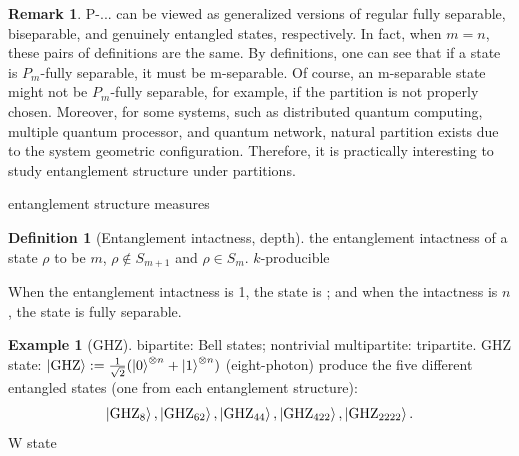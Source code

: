 \documentclass[
aps,
pra,
linenumbers,
floatfix,
]{revtex4-2}
\theoremstyle{plain}
\theoremstyle{definition}
\newtheorem{definition}{Definition}
\newtheorem{example}{Example}
\newtheorem{remark}{Remark}
\newcommand{\ghz}{\text{GHZ}}
\newcommand{\dm}{\rho}
\begin{document}
\begin{remark}
	P-... can be viewed as generalized versions of regular fully separable, biseparable, and genuinely entangled states, respectively.
	In fact, when $m=n$, these pairs of definitions are the same.
	By definitions, one can see that if a state is $P_m$-fully separable, it must be m-separable. Of course, an m-separable state might not be $P_m$-fully separable, for example, if the partition is not properly chosen.
	Moreover, for some systems, such as distributed quantum computing, multiple quantum processor, and quantum network, natural partition exists due to the system geometric conﬁguration. Therefore, it is practically interesting to study entanglement structure under partitions.
\end{remark}
entanglement structure measures
\begin{definition}[Entanglement intactness, depth]
	the entanglement intactness of a state $\dm$ to be $m$, \iff $\dm\notin S_{m+1}$ and $\dm\in S_m$.
	$k$-producible
\end{definition}
	When the entanglement intactness is 1, the state is ; and when the intactness is $n$, the state is fully separable.
\begin{example}[GHZ]\label{exm:ghz}
	bipartite: Bell states;
	nontrivial multipartite: tripartite.
	GHZ state: $\ket{\ghz}:=\frac{1}{\sqrt{2}}(\ket{0}^{\otimes n} + \ket{1}^{\otimes n} )$ (eight-photon) produce the five different entangled states (one from each entanglement structure): 
	\begin{equation*}
		\ket{\ghz_8},\ket{\ghz_{62}},\ket{\ghz_{44}},\ket{\ghz_{422}},\ket{\ghz_{2222}}.
	\end{equation*}
	W state
\end{example}
\end{document}
